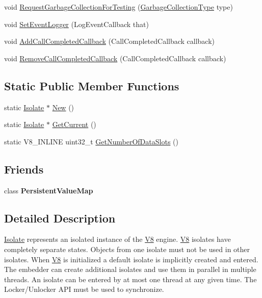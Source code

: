 \begin{DoxyCompactItemize}
\item 
void \hyperlink{classv8_1_1Isolate_a59fe893ed7e9df52cef2d59b2d98ab23}{Request\-Garbage\-Collection\-For\-Testing} (\hyperlink{classv8_1_1Isolate_a5ae00cc99d8aca148c6f5f9698c432c9}{Garbage\-Collection\-Type} type)
\item 
void \hyperlink{classv8_1_1Isolate_a28bf18f2f6ed468ec97f59df682e73c1}{Set\-Event\-Logger} (Log\-Event\-Callback that)
\item 
void \hyperlink{classv8_1_1Isolate_a89656ac26d523c31fbfdbb12fb32f078}{Add\-Call\-Completed\-Callback} (Call\-Completed\-Callback callback)
\item 
void \hyperlink{classv8_1_1Isolate_a46f0a5d35f8b29030922bdb433c0dc4f}{Remove\-Call\-Completed\-Callback} (Call\-Completed\-Callback callback)
\end{DoxyCompactItemize}
\subsection*{Static Public Member Functions}
\begin{DoxyCompactItemize}
\item 
static \hyperlink{classv8_1_1Isolate}{Isolate} $\ast$ \hyperlink{classv8_1_1Isolate_a36f397e1d09e0122e89641288f348d2d}{New} ()
\item 
static \hyperlink{classv8_1_1Isolate}{Isolate} $\ast$ \hyperlink{classv8_1_1Isolate_aa79441b5da4438221d0f38790c4de2ed}{Get\-Current} ()
\item 
static V8\-\_\-\-I\-N\-L\-I\-N\-E uint32\-\_\-t \hyperlink{classv8_1_1Isolate_a7060092fd45588f4085753b3da1b2c82}{Get\-Number\-Of\-Data\-Slots} ()
\end{DoxyCompactItemize}
\subsection*{Friends}
\begin{DoxyCompactItemize}
\item 
\hypertarget{classv8_1_1Isolate_aa96af8a34f1f35df272c683a483162da}{class {\bfseries Persistent\-Value\-Map}}\label{classv8_1_1Isolate_aa96af8a34f1f35df272c683a483162da}

\end{DoxyCompactItemize}


\subsection{Detailed Description}
\hyperlink{classv8_1_1Isolate}{Isolate} represents an isolated instance of the \hyperlink{classv8_1_1V8}{V8} engine. \hyperlink{classv8_1_1V8}{V8} isolates have completely separate states. Objects from one isolate must not be used in other isolates. When \hyperlink{classv8_1_1V8}{V8} is initialized a default isolate is implicitly created and entered. The embedder can create additional isolates and use them in parallel in multiple threads. An isolate can be entered by at most one thread at any given time. The Locker/\-Unlocker A\-P\-I must be used to synchronize. 

